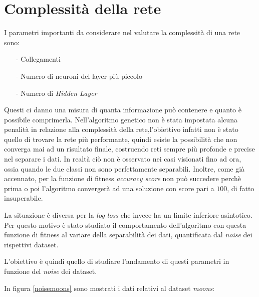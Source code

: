 \documentclass[12pt,a4paper]{report}
\begin{document}
\newpage

\section{Complessità della rete} 

I parametri importanti da considerare nel valutare la complessità di una rete sono:

\begin{enumerate}
 \item[-] Collegamenti
 \item[-] Numero di neuroni del layer più piccolo
 \item[-] Numero di \textit{Hidden Layer}
\end{enumerate}

Questi ci danno una misura di quanta informazione può contenere e quanto è possibile comprimerla.
Nell'algoritmo genetico non è stata impostata alcuna penalità in relazione alla complessità della rete,l'obiettivo infatti non è stato quello di trovare la rete più performante, quindi esiste la possibilità che non converga mai ad un risultato finale, costruendo reti sempre più profonde e precise nel separare i dati.
In realtà ciò non è osservato nei casi visionati fino ad ora, ossia quando le due classi non sono perfettamente separabili. 
Inoltre, come già accennato, per la funzione di fitness \textit{accuracy score} non può succedere perchè prima o poi l'algoritmo convergerà ad una soluzione con score pari a $100$\textdiscount, di fatto insuperabile.

La situazione è diversa per la \textit{log loss} che invece ha un limite inferiore asintotico. 
Per questo motivo è stato studiato il comportamento dell'algoritmo con questa funzione di fitness al variare della separabilità dei dati, quantificata dal \textit{noise} dei rispettivi dataset. 

L'obiettivo è quindi quello di studiare l'andamento di questi parametri in funzione del \textit{noise } dei dataset.

\newpage

In figura \ref{noisemoons} sono mostrati i dati relativi al dataset \textit{moons}:
\end{document}
